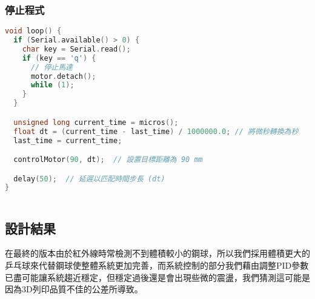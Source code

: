 \subsubsection{停止程式}
\begin{lstlisting}[language=C]
void loop() {
  if (Serial.available() > 0) {
    char key = Serial.read();
    if (key == 'q') {
      // 停止馬達
      motor.detach();
      while (1);
    }
  }

  unsigned long current_time = micros();
  float dt = (current_time - last_time) / 1000000.0; // 將微秒轉換為秒
  last_time = current_time;

  controlMotor(90, dt);  // 設置目標距離為 90 mm

  delay(50);  // 延遲以匹配時間步長 (dt)
}
  
\end{lstlisting}

\subsection{設計結果}
在最終的版本由於紅外線時常檢測不到體積較小的鋼球，所以我們採用體積更大的乒乓球來代替鋼球使整體系統更加完善，而系統控制的部分我們藉由調整PID參數已盡可能讓系統趨近穩定，但穩定過後還是會出現些微的震盪，我們猜測這可能是因為3D列印品質不佳的公差所導致。



